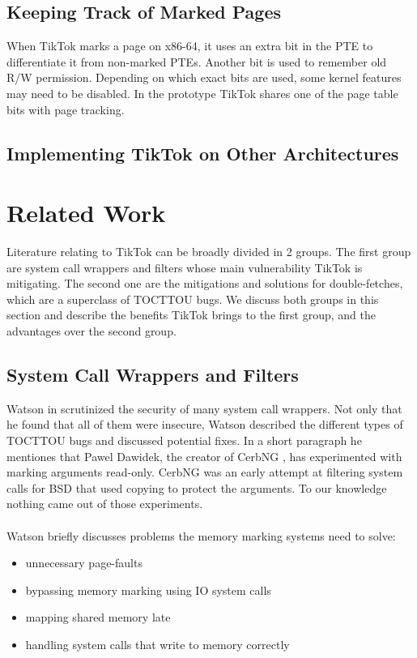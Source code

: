 \subsection{Keeping Track of Marked Pages}

When TikTok marks a page on x86-64, it uses an extra bit in the PTE to differentiate it from non-marked PTEs. Another bit is used to remember old R/W permission.
Depending on which exact bits are used, some kernel features may need to be disabled. In the prototype TikTok shares one of the page table bits with page tracking.

\subsection{Implementing TikTok on Other Architectures}



\section{Related Work}

Literature relating to TikTok can be broadly divided in 2 groups. The first group are system call wrappers and filters whose main vulnerability TikTok is mitigating.
The second one are the mitigations and solutions for double-fetches, which are a superclass of TOCTTOU bugs. We discuss both groups in this section and describe the
benefits TikTok brings to the first group, and the advantages over the second group.

\subsection{System Call Wrappers and Filters}

Watson in \cite{watson} scrutinized the security of many system call wrappers. Not only that he found that all of them were insecure, Watson described the different
types of TOCTTOU bugs and discussed potential fixes.
In a short paragraph he mentiones that Pawel Dawidek, the creator of CerbNG \cite{cerbng}, has experimented with marking arguments read-only. CerbNG was an early 
attempt at filtering system calls for BSD that used copying to protect the arguments. To our knowledge nothing came out of those experiments. 
\\
\\
Watson briefly discusses problems the memory marking systems need to solve: 
\begin{itemize}
    \item unnecessary page-faults
    \item bypassing memory marking using IO system calls
    \item mapping shared memory late
    \item handling system calls that write to memory correctly
\end{itemize}

